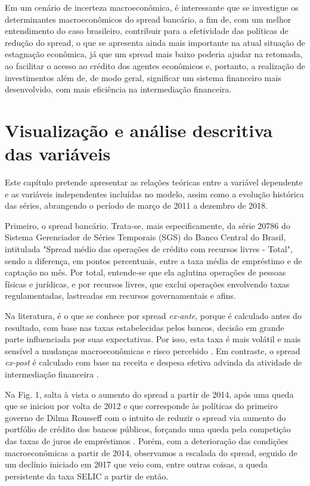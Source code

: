 \documentclass[a4paper,
               article,
               12pt,
               openany,
               oneside,
               english,
               brazil]{abntex2}
\numberwithin{equation}{section}
\begin{document}
    Em um cenário de incerteza macroeconômica, é interessante que se investigue os determinantes macroeconômicos do spread bancário, a fim de, com um melhor entendimento do caso brasileiro, contribuir para a efetividade das políticas de redução do spread, o que se apresenta ainda mais importante na atual situação de estagnação econômica, já que um spread mais baixo poderia ajudar na retomada, ao facilitar o acesso ao crédito dos agentes econômicos e, portanto, a realização de investimentos \cite[p.~8]{manhica12} além de, de modo geral, significar um sistema financeiro mais desenvolvido, com mais eficiência na intermediação financeira.

\section{Visualização e análise descritiva das variáveis}

    Este capítulo pretende apresentar as relações teóricas entre a variável dependente e as variáveis independentes incluídas no modelo, assim como a evolução histórica das séries, abrangendo o período de março de 2011 a dezembro de 2018.

    Primeiro, o spread bancário. Trata-se, mais especificamente, da série 20786 do Sistema Gerenciador de Séries Temporais (SGS) do Banco Central do Brasil, intitulada "Spread médio das operações de crédito com recursos livres - Total", sendo a diferença, em pontos percentuais, entre a taxa média de empréstimo e de captação no mês. Por total, entende-se que ela aglutina operações de pessoas físicas e jurídicas, e por recursos livres, que exclui operações envolvendo taxas regulamentadas, lastreadas em recursos governamentais e afins.

    Na literatura, é o que se conhece por spread \textit{ex-ante}, porque é calculado antes do resultado, com base nas taxas estabelecidas pelos bancos, decisão em grande parte influenciada por suas expectativas. Por isso, esta taxa é mais volátil e mais sensível a mudanças macroeconômicas e risco percebido \cite[p.~226]{leal07}. Em contraste, o spread \textit{ex-post} é calculado com base na receita e despesa efetiva advinda da atividade de intermediação financeira \cite[p.~2]{almeida15}. 
    
    Na Fig. 1, salta à vista o aumento do spread a partir de 2014, após uma queda que se iniciou por volta de 2012 e que corresponde às políticas do primeiro governo de Dilma Rousseff com o intuito de reduzir o spread via aumento do portfólio de crédito dos bancos públicos, forçando uma queda pela competição das taxas de juros de empréstimos \cite[p.~1]{almeida15}. Porém, com a deterioração das condições macroeconômicas a partir de 2014, observamos a escalada do spread, seguido de um declínio iniciado em 2017 que veio com, entre outras coisas, a queda persistente da taxa SELIC a partir de então.
\end{document}
